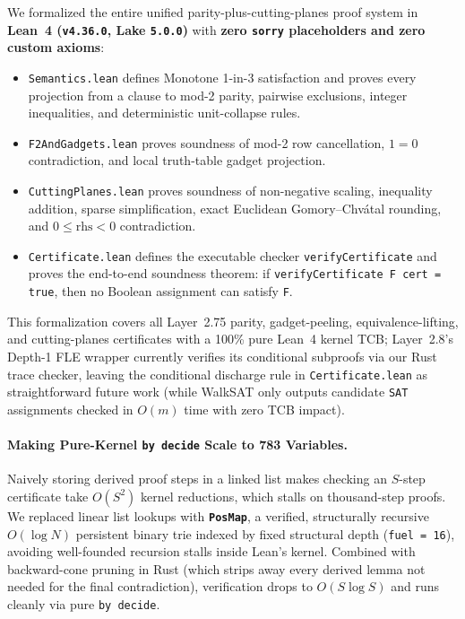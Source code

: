\documentclass[11pt]{article}
\begin{document}
We formalized the entire unified parity-plus-cutting-planes proof system in \textbf{Lean~4 (\texttt{v4.36.0}, Lake \texttt{5.0.0})} with \textbf{zero \texttt{sorry} placeholders and zero custom axioms}:
\begin{itemize}
  \item \texttt{Semantics.lean} defines Monotone 1-in-3 satisfaction and proves every projection from a clause to mod-2 parity, pairwise exclusions, integer inequalities, and deterministic unit-collapse rules.
  \item \texttt{F2AndGadgets.lean} proves soundness of mod-2 row cancellation, $1 = 0$ contradiction, and local truth-table gadget projection.
  \item \texttt{CuttingPlanes.lean} proves soundness of non-negative scaling, inequality addition, sparse simplification, exact Euclidean Gomory--Chv\'atal rounding, and $0 \le \text{rhs} < 0$ contradiction.
  \item \texttt{Certificate.lean} defines the executable checker \texttt{verifyCertificate} and proves the end-to-end soundness theorem: if \texttt{verifyCertificate F cert = true}, then no Boolean assignment can satisfy \texttt{F}.
\end{itemize}
This formalization covers all Layer~2.75 parity, gadget-peeling, equivalence-lifting, and cutting-planes certificates with a 100\% pure Lean~4 kernel TCB; Layer~2.8's Depth-1 FLE wrapper currently verifies its conditional subproofs via our Rust trace checker, leaving the conditional discharge rule in \texttt{Certificate.lean} as straightforward future work (while WalkSAT only outputs candidate \texttt{SAT} assignments checked in $O(m)$ time with zero TCB impact).

\paragraph{Making Pure-Kernel \texttt{by decide} Scale to 783 Variables.}
Naively storing derived proof steps in a linked list makes checking an $S$-step certificate take $O(S^2)$ kernel reductions, which stalls on thousand-step proofs. We replaced linear list lookups with \textbf{\texttt{PosMap}}, a verified, structurally recursive $O(\log N)$ persistent binary trie indexed by fixed structural depth (\texttt{fuel = 16}), avoiding well-founded recursion stalls inside Lean's kernel. Combined with backward-cone pruning in Rust (which strips away every derived lemma not needed for the final contradiction), verification drops to $O(S \log S)$ and runs cleanly via pure \texttt{by decide}.
\end{document}
